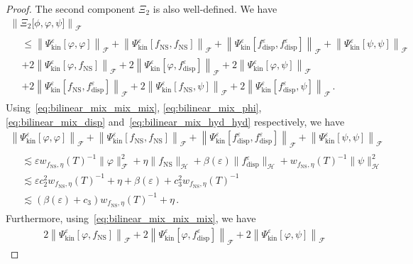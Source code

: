 \documentclass[10pt]{amsart}
\theoremstyle{definition}\newtheorem{defi}[theo]{Definition}\newtheorem{rema}[theo]{Remark}\newtheorem{exam}[theo]{Example}\newtheorem{exem}[theo]{Example}\newtheorem{nota}[theo]{Notation}
\newcommand{\ns}{\mathrm{NS}}
\newcommand{\kin}{\mathrm{kin}}
\newcommand{\disp}{\mathrm{disp}}
\newcommand{\FFF}{\mathscr{F}}
\newcommand{\HHH}{\mathscr{H}}
\newcommand{\SSSs}{\HHH}
\newcommand{\SSSm}{\FFF}
\renewcommand*\le{\leqslant}
\newcommand*\eps{{\varepsilon}}
\begin{document}
\begin{proof}
The second component $\Xi_2$ is also well-defined. We have
\begin{multline*}
\left\| \Xi_2\big[\phi, \varphi, \psi\big] \right\|_{ \SSSm }\\
\begin{aligned}
&\le \left\| \Psi^\eps_\kin\left[\varphi, \varphi \right] \right\|_{ \SSSm } + \left\| \Psi^\eps_\kin\left[f_\ns, f_\ns \right] \right\|_{ \SSSm } + \left\| \Psi^\eps_\kin\left[f^\eps_\disp, f^\eps_\disp\right] \right\|_{ \SSSm }  + \left\| \Psi^\eps_\kin\left[\psi, \psi \right] \right\|_{ \SSSm } \\
& + 2 \left\| \Psi^\eps_\kin\left[\varphi, f_\ns \right] \right\|_{ \SSSm } + 2 \left\| \Psi^\eps_\kin\left[\varphi, f_\disp^\eps \right] \right\|_{ \SSSm } + 2 \left\| \Psi^\eps_\kin\left[\varphi, \psi \right] \right\|_{ \SSSm } \\
& + 2 \left\| \Psi^\eps_\kin\left[f_\ns, f^\eps_\disp \right] \right\|_{ \SSSm } + 2 \left\| \Psi^\eps_\kin\left[f_\ns, \psi \right] \right\|_{ \SSSm } + 2 \left\| \Psi^\eps_\kin\left[f^\eps_\disp, \psi \right] \right\|_{ \SSSm }\,.
\end{aligned}
\end{multline*}
Using~\eqref{eq:bilinear_mix_mix_mix}, \eqref{eq:bilinear_mix_phi}, \eqref{eq:bilinear_mix_disp} and~\eqref{eq:bilinear_mix_hyd_hyd} respectively, we have
\begin{multline*}
\left\| \Psi^\eps_\kin \left[\varphi, \varphi \right] \right\|_{ \SSSm } + \left\| \Psi^\eps_\kin\left[f_\ns, f_\ns \right] \right\|_{ \SSSm } + \left\| \Psi^\eps_\kin\left[f^\eps_\disp, f^\eps_\disp\right] \right\|_{ \SSSm } + \left\| \Psi^\eps_\kin\left[\psi, \psi \right] \right\|_{ \SSSm }
\\
\begin{aligned}
&\lesssim \eps w_{f_\ns, \eta}(T)^{-1}\| \varphi\|_{\SSSm}^2 + \eta \| f_\ns \|_{\SSSs} +\beta(\eps)\| f_\disp^\eps\|_{\SSSs}+w_{f_\ns, \eta}(T)^{-1}\| \psi\|_{\SSSs}^2\\
& \lesssim \eps c_2^2 w_{f_\ns, \eta}(T)^{-1} + \eta + \beta(\eps) + c_3^2 w_{f_\ns, \eta}(T)^{-1} \\
&\lesssim \left(\beta(\eps) + c_3\right) w_{f_\ns, \eta}(T)^{-1} + \eta\,.
\end{aligned}
\end{multline*}
Furthermore, using~\eqref{eq:bilinear_mix_mix_mix}, we have
\begin{multline*}
2 \left\| \Psi^\eps_\kin\left[\varphi, f_\ns\right] \right\|_{ \SSSm } + 2 \left\| \Psi^\eps_\kin\left[\varphi, f_\disp^\eps\right] \right\|_{ \SSSm } + 2 \left\| \Psi^\eps_\kin\left[\varphi, \psi\right]\right\|_{ \SSSm }

\end{multline*}
\end{proof}
\end{document}

